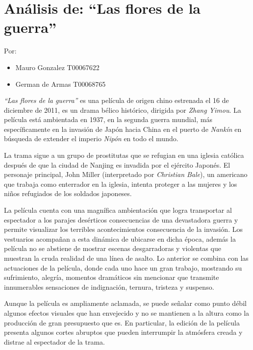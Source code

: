 \documentclass[letterpaper, 12pt]{report}
\begin{document}
\chapter*{Análisis de: ``Las flores de la guerra''}

\noindent\makebox[\linewidth]{\rule{\textwidth}{0.4pt}}

Por:
\begin{itemize}[label=$\triangleright$]
    \item Mauro Gonzalez T00067622
    \item German de Armas T00068765
\end{itemize}

\noindent\makebox[\linewidth]{\rule{\textwidth}{0.4pt}}

\nocite{Pelicula}

\textit{“Las flores de la guerra”} es una película de origen chino estrenada el 16 de 
diciembre de 2011, es un drama bélico histórico, dirigida por \textit{Zhang Yimou}. 
La película está ambientada en 1937, en la segunda guerra mundial, más 
específicamente en la invasión de Japón hacia China en el puerto de \textit{Nankín} 
en búsqueda de extender el imperio \textit{Nipón} en todo el mundo.

La trama sigue a un grupo de prostitutas que se refugian en
una iglesia católica después de que la ciudad de Nanjing es
invadida por el ejército Japonés. El personaje principal,
John Miller (interpretado por \textit{Christian Bale}), un americano
que trabaja como enterrador en la iglesia, intenta proteger
a las mujeres y los niños refugiados de los soldados
japoneses.

La película cuenta con una magnífica ambientación que logra
transportar al espectador a los parajes desérticos
consecuencias de una devastadora guerra y permite
visualizar los terribles acontecimientos consecuencia de la
invasión. Los vestuarios acompañan a esta dinámica de
ubicarse en dicha época, además la película no se abstiene
de mostrar escenas desgarradoras y violentas que muestran
la cruda realidad de una línea de asalto. Lo anterior se
combina con las actuaciones de la película, donde cada uno
hace un gran trabajo, mostrando su sufrimiento, alegría,
momentos dramáticos sin mencionar que transmite
innumerables sensaciones de indignación, ternura, tristeza
y suspenso.

Aunque la película es ampliamente aclamada, se puede
señalar como punto débil algunos efectos visuales que han
envejecido y no se mantienen a la altura como la producción
de gran presupuesto que es. En particular, la edición de la
película presenta algunos cortes abruptos que pueden
interrumpir la atmósfera creada y distrae al espectador de
la trama.
\end{document}
